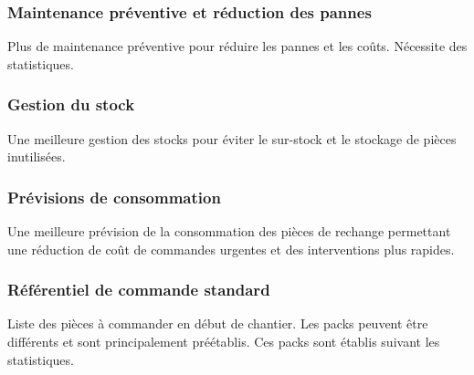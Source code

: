 \subsubsection{Maintenance préventive et réduction des pannes}

Plus de maintenance préventive pour réduire les pannes et les coûts.
Nécessite des statistiques.

\subsubsection{Gestion du stock}
	Une meilleure gestion des stocks pour éviter le sur-stock et le stockage de
pièces inutilisées.

\subsubsection{Prévisions de consommation}
	Une meilleure prévision de la consommation des pièces de rechange
permettant une réduction de coût de commandes urgentes et des interventions
plus rapides.

\subsubsection{Référentiel de commande standard}
	Liste des pièces à commander en début de chantier. Les packs peuvent être
différents et sont principalement préétablis. Ces packs sont établis suivant
les statistiques.
